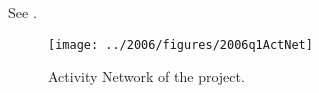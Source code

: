 \begin{subquestions}
\begin{subsubquestions}
\end{subsubquestions}


\subquestion

See .
\begin{figure}
	\begin{center}
		\texttt{[image: ../2006/figures/2006q1ActNet]}
		\caption{\label{2006:q1:fig:ActNet} Activity Network of the project.}
	\end{center}
\end{figure}

\end{subquestions}

